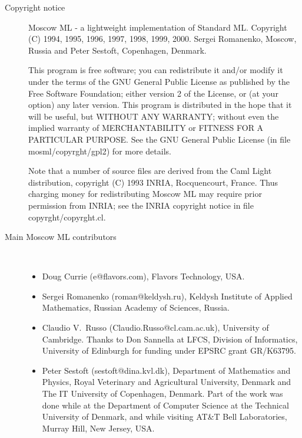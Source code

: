 \documentclass[fleqn,a4paper]{article}
\begin{document}
\begin{description}
\item[Copyright notice] Moscow ML - a lightweight implementation of
  Standard ML\@.  Copyright (C) 1994, 1995, 1996, 1997, 1998, 1999,
  2000.  Sergei Romanenko, Moscow, Russia and Peter Sestoft,
  Copenhagen, Denmark.
  
  This program is free software; you can redistribute it and/or modify
  it under the terms of the GNU General Public License as published by
  the Free Software Foundation; either version 2 of the License, or
  (at your option) any later version.  This program is distributed in
  the hope that it will be useful, but WITHOUT ANY WARRANTY; without
  even the implied warranty of MERCHANTABILITY or FITNESS FOR A
  PARTICULAR PURPOSE.  See the GNU General Public License (in file
  mosml/copyrght/gpl2) for more details.    

Note that a number of source files are derived from the Caml Light
distribution, copyright (C) 1993 INRIA, Rocquencourt, France.
Thus charging money for redistributing Moscow ML may require prior
permission from INRIA; see the INRIA copyright notice in file
copyrght/copyrght.cl.\\[2ex]


\item[Main Moscow ML contributors]\mbox{ }
  \begin{itemize}
  \item Doug Currie (e@flavors.com), Flavors Technology, USA.
  \item Sergei Romanenko (roman@keldysh.ru), Keldysh Institute of
    Applied Mathematics, Russian Academy of Sciences, Russia.
  \item Claudio V.\ Russo (Claudio.Russo@cl.cam.ac.uk), University of
    Cambridge.  Thanks to Don Sannella at LFCS, Division of
    Informatics, University of Edinburgh for funding under EPSRC grant
    GR/K63795.
  \item Peter Sestoft (sestoft@dina.kvl.dk), Department of Mathematics
    and Physics, Royal Veterinary and Agricultural University, Denmark
    and The IT University of Copenhagen, Denmark.  Part of the work
    was done while at the Department of Computer Science at the
    Technical University of Denmark, and while visiting AT\&T 
    Bell Laboratories, Murray Hill, New Jersey, USA.
  \end{itemize}


\end{description}
\end{document}
